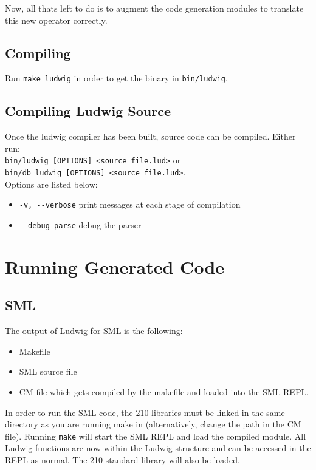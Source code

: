 \documentclass[11pt]{article}
\begin{document}
Now, all thats left to do is to augment the code generation modules to translate this new operator correctly.\\

\subsection{Compiling}
\label{compilation}
Run \verb|make ludwig| in order to get the binary in \verb|bin/ludwig|.

\subsection{Compiling Ludwig Source}
Once the ludwig compiler has been built, source code can be compiled. Either run:\\

\verb|bin/ludwig [OPTIONS] <source_file.lud>| or\\
\verb|bin/db_ludwig [OPTIONS] <source_file.lud>|.\\

Options are listed below:

\begin{itemize}
\item \verb|-v, --verbose| print messages at each stage of compilation
\item \verb|--debug-parse| debug the parser
\end{itemize}

\section{Running Generated Code}

\subsection{SML}

The output of Ludwig for SML is the following:
\begin{itemize}
\item Makefile

\item SML source file

\item CM file which gets compiled by the makefile and loaded into the SML REPL.
\end{itemize}

In order to run the SML code, the 210 libraries must be linked in the same directory as you are running make in (alternatively, change the path in the CM file). Running \verb|make| will start the SML REPL and load the compiled module. All Ludwig functions are now within the Ludwig structure and can be accessed in the REPL as normal. The 210 standard library will also be loaded.

%
\end{document}
